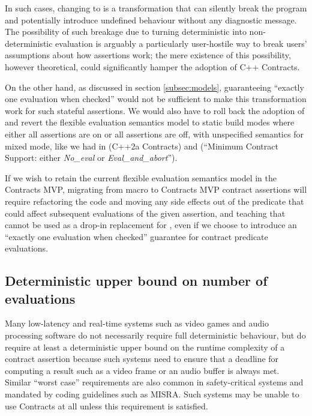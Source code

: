 In such cases, changing  to \mbox{} is a transformation that can silently break the program and potentially introduce undefined behaviour without any diagnostic message. The possibility of such breakage due to turning deterministic into non-deterministic evaluation is arguably a particularly user-hostile way to break users' assumptions about how assertions work; the mere existence of this possibility, however theoretical, could significantly hamper the adoption of C++ Contracts.

On the other hand, as discussed in section \ref{subsec:models}, guaranteeing ``exactly one evaluation when checked'' would not be sufficient to make this transformation work for such stateful assertions. We would also have to roll back the adoption of \cite{P2877R0} and revert the flexible evaluation semantics model to static build modes where either all assertions are on or all assertions are off, with unspecified semantics for mixed mode, like we had in \cite{P0542R5} (C++2a Contracts) and \cite{P2388R4} (``Minimum Contract Support: either \emph{No_eval} or \emph{Eval_and_abort}'').

If we wish to retain the current flexible evaluation semantics model in the Contracts MVP, migrating from macro  to Contracts MVP contract assertions will require refactoring the code and moving any side effects out of the predicate that could affect subsequent evaluations of the given assertion, and teaching that  cannot be used as a drop-in replacement for , even if we choose to introduce an ``exactly one evaluation when checked'' guarantee for contract predicate evaluations.

\subsection{Deterministic upper bound on number of evaluations}
\label{subsec:upper}

Many low-latency and real-time systems such as video games and audio processing software do not necessarily require full deterministic behaviour, but do require at least a deterministic upper bound on the runtime complexity of a contract assertion because such systems need to ensure that a deadline for computing a result such as a video frame or an audio buffer is always met. Similar ``worst case'' requirements are also common in safety-critical systems and mandated by coding guidelines such as MISRA. Such systems may be unable to use Contracts at all unless this requirement is satisfied.

